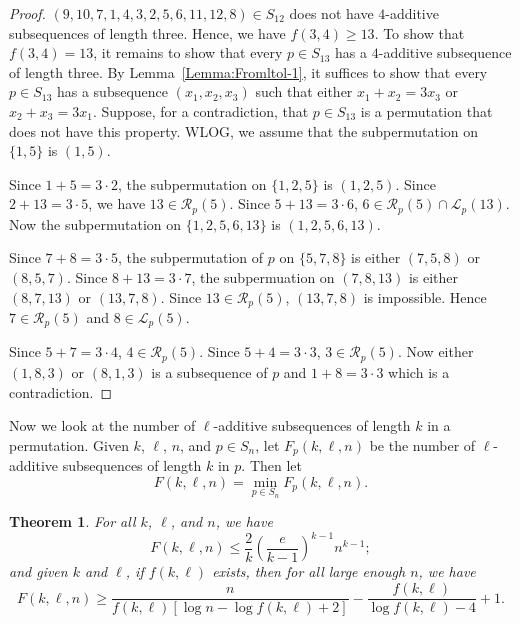 \documentclass[10pt,a4paper]{amsart}
\newtheorem{theorem}{Theorem}[section]
\begin{document}
\begin{proof}
$(9,10,7,1,4,3,2,5,6,11,12,8)\in S_{12}$ does not have $4$-additive subsequences of length three. Hence, we have $f(3,4)\geq13$. To show that $f(3,4)=13$, it remains to show that every $p\in S_{13}$ has a $4$-additive subsequence of length three. By Lemma~\ref{Lemma:Fromltol-1}, it suffices to show that every $p\in S_{13}$ has a subsequence $(x_1,x_2,x_3)$ such that either $x_1+x_2=3x_3$ or $x_2+x_3=3x_1$. Suppose, for a contradiction, that $p\in S_{13}$ is a permutation that does not have this property. WLOG, we assume that the subpermutation on $\{1,5\}$ is $(1,5)$. 

    Since $1+5=3\cdot2$, the subpermutation on $\{1,2,5\}$ is $(1,2,5)$. Since $2+13=3\cdot5$, we have $13\in\mathcal{R}_p(5)$. Since $5+13=3\cdot6$, $6\in\mathcal{R}_p(5)\cap \mathcal{L}_p(13)$. Now the subpermutation on $\{1,2,5,6,13\}$ is $(1,2,5,6,13)$.

    Since $7+8=3\cdot5$, the subpermutation of $p$ on $\{5,7,8\}$ is either $(7,5,8)$ or $(8,5,7)$. Since $8+13=3\cdot7$, the subpermuation on $(7,8,13)$ is either $(8,7,13)$ or $(13,7,8)$. Since $13\in\mathcal{R}_p(5)$, $(13,7,8)$ is impossible. Hence $7\in\mathcal{R}_p(5)$ and $8\in\mathcal{L}_p(5)$.

    Since $5+7=3\cdot4$, $4\in\mathcal{R}_p(5)$. Since $5+4=3\cdot3$, $3\in\mathcal{R}_p(5)$. Now either $(1,8,3)$ or $(8,1,3)$ is a subsequence of $p$ and $1+8=3\cdot3$ which is a contradiction.
\end{proof}    
Now we look at the number of $\ell$-additive subsequences of length $k$ in a permutation. Given $k$, $\ell$, $n$, and $p\in S_n$, let $F_p(k,\ell,n)$ be the number of $\ell$-additive subsequences of length $k$ in $p$. Then let 
\[
F(k,\ell,n)=\min_{p\in S_n}F_p(k,\ell,n).
\]


\begin{theorem}\label{Theorem:NumberOfAdditiveGeneral}
For all $k$, $\ell$, and $n$, we have
    \[
    F(k,\ell,n)\leq\frac{2}{k}\left(\frac{e}{k-1}\right)^{k-1}n^{k-1};
    \]
    and given $k$ and $\ell$, if $f(k,\ell)$ exists, then for all large enough $n$, we have
    \[
    F(k,\ell,n)\geq \frac{n}{f(k,\ell)[\log n-\log f(k,\ell)+2]}-\frac{f(k,\ell)}{\log f(k,\ell)-4}+1.
    \]
\end{theorem}
\end{document}
